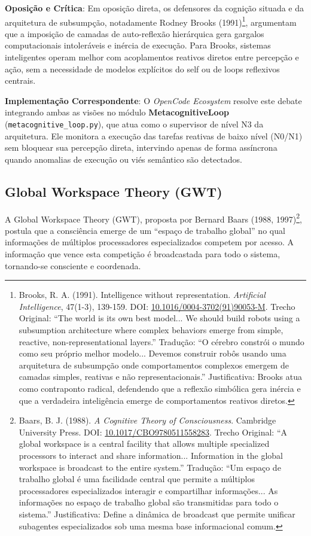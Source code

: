 \documentclass[12pt,a4paper,oneside]{abntex2}
\begin{document}
\textbf{Oposição e Crítica}: Em oposição direta, os defensores da cognição situada e da arquitetura de subsumpção, notadamente Rodney Brooks (1991)\footnote{Brooks, R. A. (1991). Intelligence without representation. \textit{Artificial Intelligence}, 47(1-3), 139-159. DOI: \href{https://doi.org/10.1016/0004-3702(91)90053-M}{10.1016/0004-3702(91)90053-M}. Trecho Original: ``The world is its own best model... We should build robots using a subsumption architecture where complex behaviors emerge from simple, reactive, non-representational layers.'' Tradução: ``O cérebro constrói o mundo como seu próprio melhor modelo... Devemos construir robôs usando uma arquitetura de subsumpção onde comportamentos complexos emergem de camadas simples, reativas e não representacionais.'' Justificativa: Brooks atua como contraponto radical, defendendo que a reflexão simbólica gera inércia e que a verdadeira inteligência emerge de comportamentos reativos diretos.}, argumentam que a imposição de camadas de auto-reflexão hierárquica gera gargalos computacionais intoleráveis e inércia de execução. Para Brooks, sistemas inteligentes operam melhor com acoplamentos reativos diretos entre percepção e ação, sem a necessidade de modelos explícitos do self ou de loops reflexivos centrais.

\textbf{Implementação Correspondente}: O \textit{OpenCode Ecosystem} resolve este debate integrando ambas as visões no módulo \textbf{MetacognitiveLoop} (\texttt{metacognitive\_loop.py}), que atua como o supervisor de nível N3 da arquitetura. Ele monitora a execução das tarefas reativas de baixo nível (N0/N1) sem bloquear sua percepção direta, intervindo apenas de forma assíncrona quando anomalias de execução ou viés semântico são detectados.

\subsection{Global Workspace Theory (GWT)}

A Global Workspace Theory (GWT), proposta por Bernard Baars (1988, 1997)\footnote{Baars, B. J. (1988). \textit{A Cognitive Theory of Consciousness}. Cambridge University Press. DOI: \href{https://doi.org/10.1017/CBO9780511558283}{10.1017/CBO9780511558283}. Trecho Original: ``A global workspace is a central facility that allows multiple specialized processors to interact and share information... Information in the global workspace is broadcast to the entire system.'' Tradução: ``Um espaço de trabalho global é uma facilidade central que permite a múltiplos processadores especializados interagir e compartilhar informações... As informações no espaço de trabalho global são transmitidas para todo o sistema.'' Justificativa: Define a dinâmica de broadcast que permite unificar subagentes especializados sob uma mesma base informacional comum.}, postula que a consciência emerge de um ``espaço de trabalho global'' no qual informações de múltiplos processadores especializados competem por acesso. A informação que vence esta competição é broadcastada para todo o sistema, tornando-se consciente e coordenada.
\end{document}
